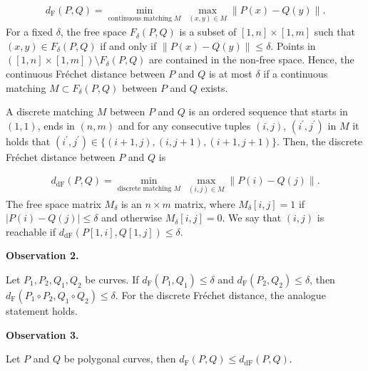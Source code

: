 \par
\[\begin{aligned}
d_{\text{F}}(P,Q)=\min_{\text{continuous matching }M}\ \max_{(x,y)\in M}\|P(x)%
-Q(y)\|.
\end{aligned}\]
For a fixed $\delta$, the free space $F_{\delta}(P,Q)$ is a subset of $[1,n]\times[1,m]$ such that $(x,y)\in F_{\delta}(P,Q)$ if and only if $\|P(x)-Q(y)\|\leq\delta$. Points in $([1,n]\times[1,m])\setminus F_{\delta}(P,Q)$ are contained in the non-free space. Hence, the continuous Fréchet distance between $P$ and $Q$ is at most $\delta$ if a continuous matching $M\subset F_{\delta}(P,Q)$ between $P$ and $Q$ exists.
\par
\par
A discrete matching $M$ between $P$ and $Q$ is an ordered sequence that starts in $(1,1)$, ends in $(n,m)$ and for any consecutive tuples $(i,j)$, $(i^{\prime},j^{\prime})$ in $M$ it holds that $(i^{\prime},j^{\prime})\in\{(i+1,j),(i,j+1),(i+1,j+1)\}$. Then, the discrete Fréchet distance between $P$ and $Q$ is
\par
\[\begin{aligned}
d_{\text{dF}}(P,Q)=\min_{\text{discrete matching }M}\ \max_{(i,j)\in M}\|P(i)-%
Q(j)\|.
\end{aligned}\]
The free space matrix $M_{\delta}$ is an $n\times m$ matrix, where $M_{\delta}[i,j]=1$ if $|P(i)-Q(j)|\leq\delta$ and otherwise $M_{\delta}[i,j]=0$. We say that $(i,j)$ is reachable if $d_{\text{dF}}(P[1,i],Q[1,j])\leq\delta$.
\par
\par
\par\medskip\noindent\textbf{Observation 2.}\par
Let $P_{1},P_{2},Q_{1},Q_{2}$ be curves. If $d_{\text{F}}(P_{1},Q_{1})\leq\delta$ and $d_{\text{F}}(P_{2},Q_{2})\leq\delta$, then ${d_{\text{F}}(P_{1}\circ P_{2},Q_{1}\circ Q_{2})\leq\delta}$. For the discrete Fréchet distance, the analogue statement holds.
\par
\par
\par
\par\medskip\noindent\textbf{Observation 3.}\par
Let $P$ and $Q$ be polygonal curves, then $d_{\text{F}}(P,Q)\leq d_{\text{dF}}(P,Q)$.
\par
\par
\par
